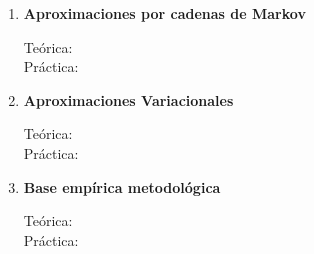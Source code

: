 \documentclass[10pt]{article}
\begin{document}
\begin{enumerate}

\vspace{0.1cm}
\item \textbf{Aproximaciones por cadenas de Markov}
\vspace{-0.15cm}
\begin{description}
\item[Teórica:]
\item[Práctica:]
\end{description}


\vspace{0.1cm}
\item \textbf{Aproximaciones Variacionales}
\vspace{-0.15cm}
\begin{description}
\item[Teórica:]
\item[Práctica:]
\end{description}


\vspace{0.1cm}
\item \textbf{Base empírica metodológica}
\vspace{-0.15cm}
\begin{description}
\item[Teórica:]
\item[Práctica:]
\end{description}

\end{enumerate}
% 
% 
\end{document}
